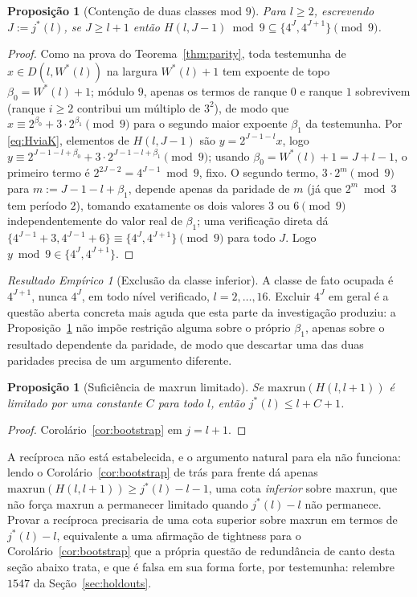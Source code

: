 \documentclass[11pt]{amsart}
\theoremstyle{plain}
\newtheorem{proposition}[theorem]{Proposi\c{c}\~ao}
\theoremstyle{definition}
\theoremstyle{remark}
\newtheorem{empresult}[theorem]{Resultado Emp\'irico}
\begin{document}
\begin{proposition}[Contenção de duas classes mod $9$]
\label{prop:mod9}
Para $l\ge2$, escrevendo $J:=j^*(l)$, se $J\ge l+1$ então $H(l,J-1) \bmod 9 \subseteq \{4^J,
4^{J+1}\}\pmod9$.
\end{proposition}

\begin{proof}
Como na prova do Teorema~\ref{thm:parity}, toda testemunha de $x\in D(l,W^*(l))$ na largura
$W^*(l)+1$ tem expoente de topo $\beta_0=W^*(l)+1$; módulo $9$, apenas os termos de ranque $0$ e
ranque $1$ sobrevivem (ranque $i\ge2$ contribui um múltiplo de $3^2$), de modo que
$x\equiv2^{\beta_0}+3\cdot2^{\beta_1}\pmod9$ para o segundo maior expoente $\beta_1$ da testemunha.
Por \eqref{eq:HviaK}, elementos de $H(l,J-1)$ são $y=2^{J-1-l}x$, logo
$y\equiv2^{J-1-l+\beta_0}+3\cdot2^{J-1-l+\beta_1}\pmod9$; usando $\beta_0=W^*(l)+1=J+l-1$, o
primeiro termo é $2^{2J-2}=4^{J-1}\bmod9$, fixo. O segundo termo, $3\cdot2^m\pmod9$ para
$m:=J-1-l+\beta_1$, depende apenas da paridade de $m$ (já que $2^m\bmod3$ tem período $2$),
tomando exatamente os dois valores $3$ ou $6\pmod9$ independentemente do valor real de $\beta_1$;
uma verificação direta dá $\{4^{J-1}+3,4^{J-1}+6\}\equiv\{4^J,4^{J+1}\}\pmod9$ para todo $J$. Logo
$y\bmod9\in\{4^J,4^{J+1}\}$.
\end{proof}

\begin{empresult}[Exclusão da classe inferior]
\label{er:mod9}
A classe de fato ocupada é $4^{J+1}$, nunca $4^J$, em todo nível verificado, $l=2,\dots,16$.
Excluir $4^J$ em geral é a questão aberta concreta mais aguda que esta parte da investigação
produziu: a Proposição~\ref{prop:mod9} não impõe restrição alguma sobre o próprio $\beta_1$,
apenas sobre o resultado dependente da paridade, de modo que descartar uma das duas paridades
precisa de um argumento diferente.
\end{empresult}

\begin{proposition}[Suficiência de maxrun limitado]
\label{prop:h014}
Se $\mathrm{maxrun}(H(l,l+1))$ é limitado por uma constante $C$ para todo $l$, então
$j^*(l) \le l + C + 1$.
\end{proposition}

\begin{proof}
Corolário~\ref{cor:bootstrap} em $j=l+1$.
\end{proof}

A recíproca não está estabelecida, e o argumento natural para ela não funciona: lendo o
Corolário~\ref{cor:bootstrap} de trás para frente dá apenas $\mathrm{maxrun}(H(l,l+1)) \ge j^*(l)-l-1$,
uma cota \emph{inferior} sobre maxrun, que não força maxrun a permanecer limitado quando $j^*(l)-l$
não permanece. Provar a recíproca precisaria de uma cota superior sobre maxrun em termos de
$j^*(l)-l$, equivalente a uma afirmação de tightness para o Corolário~\ref{cor:bootstrap} que a
própria questão de redundância de canto desta seção abaixo trata, e que é falsa em sua forma forte,
por testemunha: relembre $1547$ da Seção~\ref{sec:holdouts}.
\end{document}
